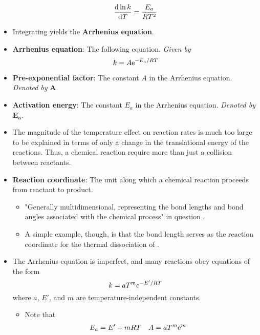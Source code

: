\documentclass[../notes.tex]{subfiles}
\begin{document}
\begin{itemize}
    \begin{equation*}
        \dv{\ln k}{T} = \frac{E_a}{RT^2}
    \end{equation*}
    \item Integrating yields the \textbf{Arrhenius equation}.
    \item \textbf{Arrhenius equation}: The following equation. \emph{Given by}
    \begin{equation*}
        k = A\e[-E_a/RT]
    \end{equation*}
    \item \textbf{Pre-exponential factor}: The constant $A$ in the Arrhenius equation. \emph{Denoted by} $\bm{A}$.
    \item \textbf{Activation energy}: The constant $E_a$ in the Arrhenius equation. \emph{Denoted by} $\bm{E_a}$.
    \item The magnitude of the temperature effect on reaction rates is much too large to be explained in terms of only a change in the translational energy of the reactions. Thus, a chemical reaction require more than just a collision between reactants.
    \item \textbf{Reaction coordinate}: The unit along which a chemical reaction proceeds from reactant to product.
    \begin{itemize}
        \item "Generally multidimensional, representing the bond lengths and bond angles associated with the chemical process" in question \parencite[1073]{bib:McQuarrieSimon}.
        \item A simple example, though, is that the  bond length serves as the reaction coordinate for the thermal dissociation of .
    \end{itemize}
    \item The Arrhenius equation is imperfect, and many reactions obey equations of the form
    \begin{equation*}
        k = aT^m\e[-E'/RT]
    \end{equation*}
    where $a$, $E'$, and $m$ are temperature-independent constants.
    \begin{itemize}
        \item Note that
        \begin{align*}
            E_a &= E'+mRT&
            A &= aT^m\e[m]
        \end{align*}
    \end{itemize}
\end{itemize}
\end{document}

